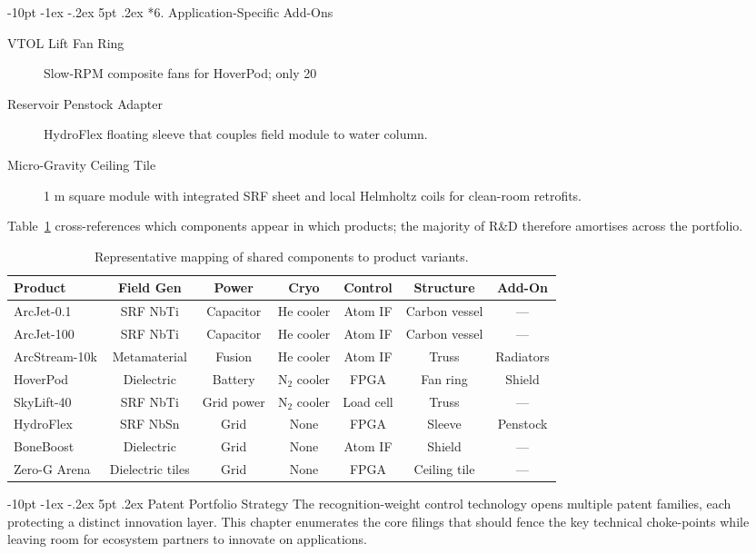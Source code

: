 \documentclass[12pt,letterpaper]{book}
\makeatletter
\renewcommand\section{\@startsection{section}{1}{\z@}%
  {-8pt \@plus -1ex \@minus -.2ex}%
  {4pt \@plus.2ex}%
  {\normalfont\large\bfseries}}
\renewcommand\section{\@startsection {section}{1}{\z@}%
                {-10pt \@plus -1ex \@minus -.2ex}%
                {5pt \@plus.2ex}%
                {\normalfont\large\bfseries}}
\makeatother
\begin{document}
\section*{6. Application-Specific Add-Ons}
\begin{description}
 \item[VTOL Lift Fan Ring] Slow-RPM composite fans for HoverPod; only 20 %
 \item[Reservoir Penstock Adapter] HydroFlex floating sleeve that couples field module to water column.
 \item[Micro-Gravity Ceiling Tile] 1 m square module with integrated SRF sheet and local Helmholtz coils for clean-room retrofits.
\end{description}

Table~\ref{tab:component_map} cross-references which components appear in which products; the majority of R&D therefore amortises across the portfolio.

\begin{table}[h]
\centering
\begin{tabular}{@{}lcccccc@{}}
\toprule
Product & Field Gen & Power & Cryo & Control & Structure & Add-On \\ \midrule
ArcJet-0.1 & SRF NbTi & Capacitor & He cooler & Atom IF & Carbon vessel & — \\
ArcJet-100 & SRF NbTi & Capacitor & He cooler & Atom IF & Carbon vessel & — \\
ArcStream-10k & Metamaterial & Fusion & He cooler & Atom IF & Truss & Radiators \\
HoverPod & Dielectric & Battery & N$_2$ cooler & FPGA & Fan ring & Shield \\
SkyLift-40 & SRF NbTi & Grid power & N$_2$ cooler & Load cell & Truss & — \\
HydroFlex & SRF NbSn & Grid & None & FPGA & Sleeve & Penstock \\
BoneBoost & Dielectric & Grid & None & Atom IF & Shield & — \\
Zero-G Arena & Dielectric tiles & Grid & None & FPGA & Ceiling tile & — \\
\bottomrule
\end{tabular}
\caption{Representative mapping of shared components to product variants.}
\label{tab:component_map}
\end{table}

\section{Patent Portfolio Strategy}\label{chap:patents}
The recognition-weight control technology opens multiple patent families, each protecting a distinct innovation layer.  This chapter enumerates the core filings that should fence the key technical choke-points while leaving room for ecosystem partners to innovate on applications.
\end{document}

